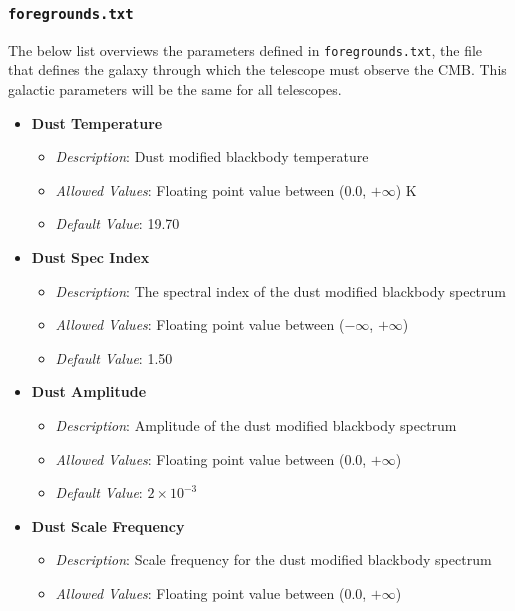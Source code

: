 \documentclass[11pt]{article} %
\begin{document}

\subsubsection{\texttt{foregrounds.txt}}

The below list overviews the parameters defined in \texttt{foregrounds.txt}, the file that defines the galaxy through which the telescope must observe the CMB. This galactic parameters will be the same for all telescopes.

\begin{itemize}[noitemsep,topsep=0pt]
	\item \textbf{Dust Temperature}
		\begin{itemize}[noitemsep,topsep=0pt]
		\item \textit{Description}: Dust modified blackbody temperature 
		\item \textit{Allowed Values}: Floating point value between (0.0, $+\infty$) K
		\item \textit{Default Value}: 19.70
		\end{itemize}
	\item \textbf{Dust Spec Index}
		\begin{itemize}[noitemsep,topsep=0pt]
		\item \textit{Description}: The spectral index of the dust modified blackbody spectrum
		\item \textit{Allowed Values}: Floating point value between ($-\infty$, $+\infty$)
		\item \textit{Default Value}: 1.50
		\end{itemize}
	\item \textbf{Dust Amplitude}
		\begin{itemize}[noitemsep,topsep=0pt]
		\item \textit{Description}: Amplitude of the dust modified blackbody spectrum 
		\item \textit{Allowed Values}: Floating point value between (0.0, $+\infty$)
		\item \textit{Default Value}: $2 \times 10^{-3}$
		\end{itemize}
	\item \textbf{Dust Scale Frequency}
		\begin{itemize}[noitemsep,topsep=0pt]
		\item \textit{Description}: Scale frequency for the dust modified blackbody spectrum
		\item \textit{Allowed Values}: Floating point value between (0.0, $+\infty$)

\end{itemize}
\end{itemize}
\end{document}

